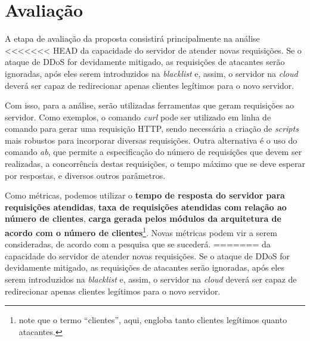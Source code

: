 \documentclass[a4paper, 11pt]{article}
\begin{document}



\section{Avalia\c{c}\~{a}o}
A etapa de avalia\c{c}\~{a}o da proposta consistirá principalmente na análise
<<<<<<< HEAD
da capacidade do servidor de atender novas requisições. Se o ataque de DDoS for
devidamente
mitigado, as requisições de atacantes serão ignoradas, após eles serem
introduzidos na \emph{blacklist}
e, assim, o servidor na \emph{cloud} deverá ser capaz de redirecionar apenas
clientes legítimos
para o novo servidor.

Com isso, para a análise, serão utilizadas ferramentas que geram requisições ao
servidor. Como exemplos, o comando
\emph{curl} pode ser utilizado em linha de comando para gerar uma requisição
HTTP, sendo necessária a criação de \emph{scripts} mais robustos para incorporar
diversas requisições. Outra alternativa é o uso do comando \emph{ab}, que
permite a especificação do número de requisições que devem ser realizadas, a
concorrência destas requisições, o tempo máximo que se deve esperar por
respostas, e diversos outros parâmetros.

Como métricas, podemos utilizar o \textbf{tempo de resposta do servidor para
requisições atendidas}, \textbf{taxa de requisições atendidas com relação ao
número de clientes}, \textbf{carga gerada pelos módulos da arquitetura de acordo
com o número de clientes}\footnote{note que o termo ``clientes'', aqui, engloba
tanto clientes legítimos quanto atacantes.}. Novas métricas podem vir a serem
consideradas, de acordo com a pesquisa que se sucederá.
=======
da capacidade do servidor de atender novas requisições. Se o ataque de DDoS for devidamente
mitigado, as requisições de atacantes serão ignoradas, após eles serem introduzidos na \emph{blacklist}
e, assim, o servidor na \emph{cloud} deverá ser capaz de redirecionar apenas clientes legítimos 
para o novo servidor.
\end{document}
